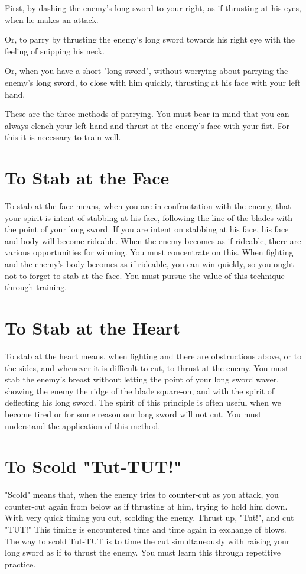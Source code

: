 \documentclass[12pt]{report}
\begin{document}
First, by dashing the enemy's long sword to your right, as if thrusting at his eyes, when he makes an attack.

Or, to parry by thrusting the enemy's long sword towards his right eye with the feeling of snipping his neck.

Or, when you have a short "long sword", without worrying about parrying the enemy's long sword, to close with him quickly, thrusting at his face with your left hand.

These are the three methods of parrying. You must bear in mind that you can always clench your left hand and thrust at the enemy's face with your fist. For this it is necessary to train well.
\section*{To Stab at the Face}
To stab at the face means, when you are in confrontation with the enemy, that your spirit is intent of stabbing at his face, following the line of the blades with the point of your long sword. If you are intent on stabbing at his face, his face and body will become rideable. When the enemy becomes as if rideable, there are various opportunities for winning. You must concentrate on this. When fighting and the enemy's body becomes as if rideable, you can win quickly, so you ought not to forget to stab at the face. You must pursue the value of this technique through training.
\section*{To Stab at the Heart}
To stab at the heart means, when fighting and there are obstructions above, or to the sides, and whenever it is difficult to cut, to thrust at the enemy. You must stab the enemy's breast without letting the point of your long sword waver, showing the enemy the ridge of the blade square-on, and with the spirit of deflecting his long sword. The spirit of this principle is often useful when we become tired or for some reason our long sword will not cut. You must understand the application of this method.
\section*{To Scold "Tut-TUT!"}
"Scold" means that, when the enemy tries to counter-cut as you attack, you counter-cut again from below as if thrusting at him, trying to hold him down. With very quick timing you cut, scolding the enemy. Thrust up, "Tut!", and cut "TUT!" This timing is encountered time and time again in exchange of blows. The way to scold Tut-TUT is to time the cut simultaneously with raising your long sword as if to thrust the enemy. You must learn this through repetitive practice.
\end{document}
